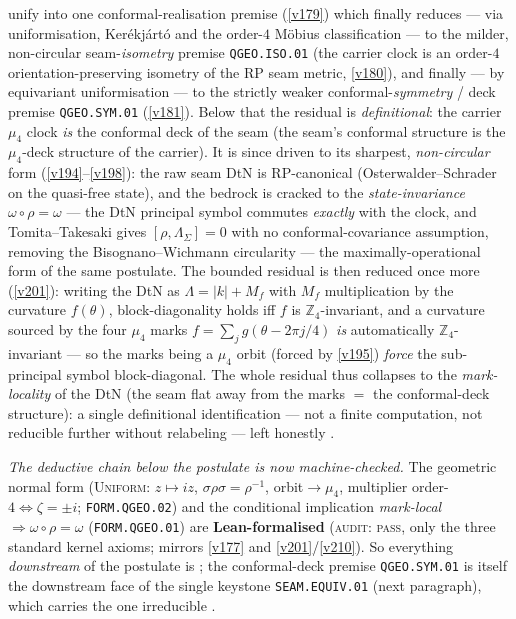 \documentclass[11pt,a4paper]{article}
\newcommand{\Z}{\mathbb Z}
\begin{document}
\begin{keybox}
unify into one conformal-realisation premise (\vref{v179}) which finally reduces --- via uniformisation,
Ker\'ekj\'art\'o and the order-$4$ M\"obius classification --- to the milder, non-circular
seam-\emph{isometry} premise \texttt{QGEO.ISO.01} (the carrier clock is an order-$4$
orientation-preserving isometry of the RP seam metric, \vref{v180}), and finally --- by equivariant
uniformisation --- to the strictly weaker conformal-\emph{symmetry} / deck premise \texttt{QGEO.SYM.01}
(\vref{v181}). Below that the residual is \emph{definitional}: the carrier $\mu_4$ clock \emph{is} the
conformal deck of the seam (the seam's conformal structure is the $\mu_4$-deck structure of the carrier).
It is since driven to its sharpest, \emph{non-circular} form (\vref{v194}--\vref{v198}): the raw seam DtN
is RP-canonical (Osterwalder--Schrader on the quasi-free state), and the bedrock is cracked to the
\emph{state-invariance} $\omega\circ\rho=\omega$ --- the DtN principal symbol commutes \emph{exactly} with
the clock, and Tomita--Takesaki gives $[\rho,\Lambda_\Sigma]=0$ with no conformal-covariance assumption,
removing the Bisognano--Wichmann circularity --- the maximally-operational form of the same postulate.
The bounded residual is then reduced once more (\vref{v201}): writing the DtN as $\Lambda=|k|+M_f$ with
$M_f$ multiplication by the curvature $f(\theta)$, block-diagonality holds iff $f$ is $\Z_4$-invariant, and a
curvature sourced by the four $\mu_4$ marks $f=\sum_{j}g(\theta-2\pi j/4)$ \emph{is} automatically
$\Z_4$-invariant --- so the marks being a $\mu_4$ orbit (forced by \vref{v195}) \emph{force} the
sub-principal symbol block-diagonal. The whole residual thus collapses to the \emph{mark-locality} of the
DtN (the seam flat away from the marks $=$ the conformal-deck structure): a single definitional
identification --- not a finite computation, not reducible further without relabeling --- left honestly \mO.
\par\smallskip\noindent\emph{The deductive chain below the postulate is now machine-checked.} The
geometric normal form (\textsc{Uniform}: $z\mapsto iz$, $\sigma\rho\sigma=\rho^{-1}$, orbit$\to\mu_4$,
multiplier order-$4\Leftrightarrow\zeta{=}\pm i$; \texttt{FORM.QGEO.02}) and the conditional implication
\emph{mark-local}$\Rightarrow\omega\circ\rho=\omega$ (\texttt{FORM.QGEO.01}) are \textbf{Lean-formalised}
(\textsc{audit: pass}, only the three standard kernel axioms; mirrors \vref{v177} and \vref{v201}/\vref{v210}).
So everything \emph{downstream} of the postulate is \mE; the conformal-deck premise \texttt{QGEO.SYM.01} is
itself the downstream face of the single keystone \texttt{SEAM.EQUIV.01} (next paragraph), which carries the
one irreducible \mO.
\end{keybox}
\end{document}
